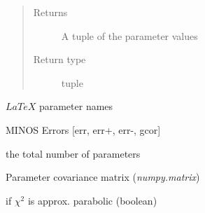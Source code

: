 \documentclass[a4paper,10pt,english]{sphinxmanual}
\begin{document}
\begin{fulllineitems}
\begin{fulllineitems}
\begin{quote}
\begin{description}
\item[{Returns}] \leavevmode
A tuple of the parameter values

\item[{Return type}] \leavevmode
tuple

\end{description}\end{quote}

\end{fulllineitems}


\begin{fulllineitems}
\label{index:kafe.fit.Fit.latex_parameter_names}
\(LaTeX\) parameter names

\end{fulllineitems}


\begin{fulllineitems}
\label{index:kafe.fit.Fit.minos_errors}
MINOS Errors {[}err, err+, err-, gcor{]}

\end{fulllineitems}


\begin{fulllineitems}
\label{index:kafe.fit.Fit.number_of_parameters}
the total number of parameters

\end{fulllineitems}


\begin{fulllineitems}
\label{index:kafe.fit.Fit.par_cov_mat}
Parameter covariance matrix (\emph{numpy.matrix})

\end{fulllineitems}


\begin{fulllineitems}
\label{index:kafe.fit.Fit.parabolic_errors}
 if \(\chi^2\) is approx. parabolic (boolean)


\end{fulllineitems}
\end{fulllineitems}
\end{document}

